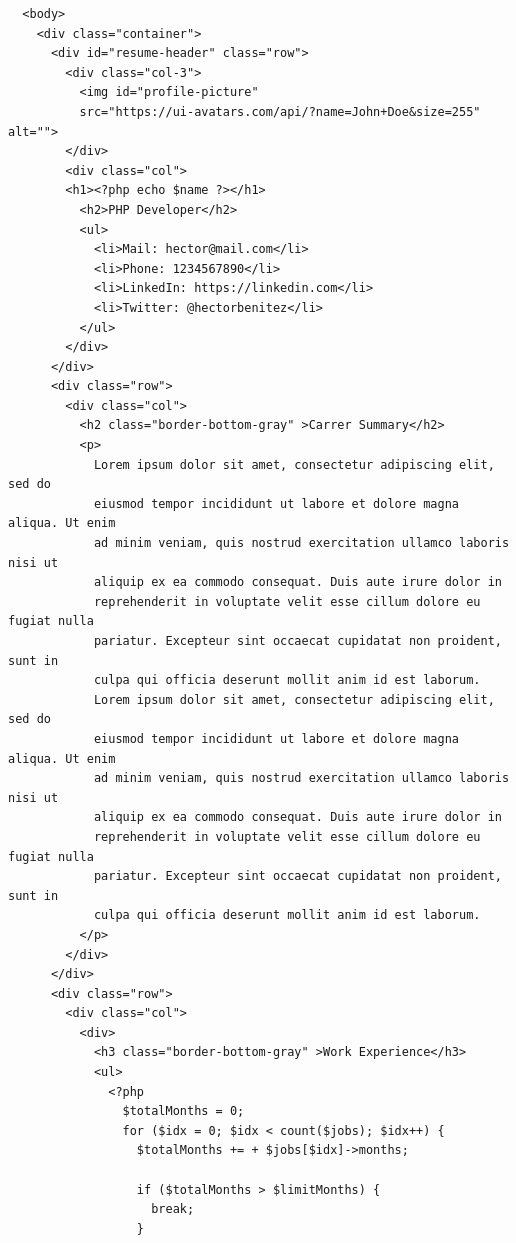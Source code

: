 \documentclass{article}
\begin{document}
\begin{verbatim}
  <body>
    <div class="container">
      <div id="resume-header" class="row">
        <div class="col-3">
          <img id="profile-picture"
          src="https://ui-avatars.com/api/?name=John+Doe&size=255" alt="">
        </div>
        <div class="col">
        <h1><?php echo $name ?></h1>
          <h2>PHP Developer</h2>
          <ul>
            <li>Mail: hector@mail.com</li>
            <li>Phone: 1234567890</li>
            <li>LinkedIn: https://linkedin.com</li>
            <li>Twitter: @hectorbenitez</li>
          </ul>
        </div>
      </div>
      <div class="row">
        <div class="col">
          <h2 class="border-bottom-gray" >Carrer Summary</h2>
          <p>
            Lorem ipsum dolor sit amet, consectetur adipiscing elit, sed do
            eiusmod tempor incididunt ut labore et dolore magna aliqua. Ut enim
            ad minim veniam, quis nostrud exercitation ullamco laboris nisi ut
            aliquip ex ea commodo consequat. Duis aute irure dolor in
            reprehenderit in voluptate velit esse cillum dolore eu fugiat nulla
            pariatur. Excepteur sint occaecat cupidatat non proident, sunt in
            culpa qui officia deserunt mollit anim id est laborum.
            Lorem ipsum dolor sit amet, consectetur adipiscing elit, sed do
            eiusmod tempor incididunt ut labore et dolore magna aliqua. Ut enim
            ad minim veniam, quis nostrud exercitation ullamco laboris nisi ut
            aliquip ex ea commodo consequat. Duis aute irure dolor in
            reprehenderit in voluptate velit esse cillum dolore eu fugiat nulla
            pariatur. Excepteur sint occaecat cupidatat non proident, sunt in
            culpa qui officia deserunt mollit anim id est laborum.
          </p>
        </div>
      </div>
      <div class="row">
        <div class="col">
          <div>
            <h3 class="border-bottom-gray" >Work Experience</h3>
            <ul>
              <?php
                $totalMonths = 0;
                for ($idx = 0; $idx < count($jobs); $idx++) {
                  $totalMonths += + $jobs[$idx]->months;

                  if ($totalMonths > $limitMonths) {
                    break;
                  }


\end{verbatim}
\end{document}
